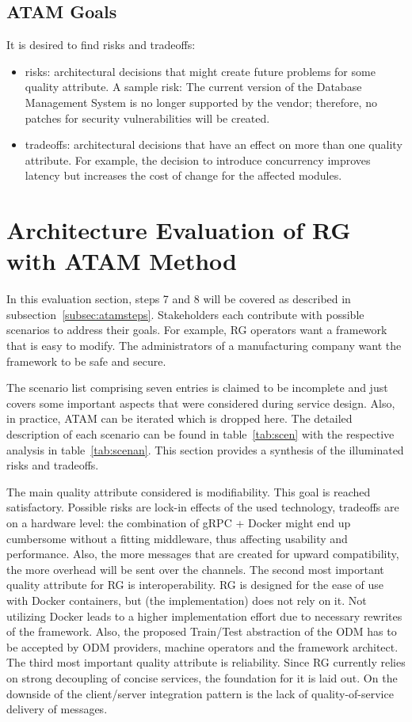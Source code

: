\subsection{ATAM Goals}
\label{subsec:atamgoa}
It is desired to find risks and tradeoffs:
\begin{itemize}
    \item risks: architectural decisions that might create future problems for some quality attribute. A sample risk: The current version of the Database Management System is no longer supported by the vendor; therefore, no patches for security vulnerabilities will be created.
    \item tradeoffs: architectural decisions that have an effect on more than one quality attribute.     For example, the decision to introduce concurrency improves latency but increases the cost of change for the affected modules. 
\end{itemize}

\section{Architecture Evaluation of RG with ATAM Method}
In this evaluation section, steps 7 and 8 will be covered as described in subsection~\ref{subsec:atamsteps}. Stakeholders each contribute with possible scenarios to address their goals. For example, RG operators want a framework that is easy to modify. The administrators of a manufacturing company want the framework to be safe and secure. 

The scenario list comprising seven entries is claimed to be incomplete and just covers some important aspects that were considered during service design. Also, in practice, ATAM can be iterated which is dropped here. The detailed description of each scenario can be found in table~\ref{tab:scen} with the respective analysis in table~\ref{tab:scenan}. This section provides a synthesis of the illuminated risks and tradeoffs. 

The main quality attribute considered is modifiability. This goal is reached satisfactory. Possible risks are lock-in effects of the used technology, tradeoffs are on a hardware level: the combination of gRPC + Docker might end up cumbersome without a fitting middleware, thus affecting usability and performance. Also, the more messages that are created for upward compatibility, the more overhead will be sent over the channels. The second most important quality attribute for RG is interoperability. RG is designed for the ease of use with Docker containers, but (the implementation) does not rely on it. Not utilizing Docker leads to a higher implementation effort due to necessary rewrites of the framework. Also, the proposed Train/Test abstraction of the ODM has to be accepted by ODM providers, machine operators and the framework architect. The third most important quality attribute is reliability. Since RG currently relies on strong decoupling of concise services, the foundation for it is laid out. On the downside of the client/server integration pattern is the lack of quality-of-service delivery of messages.

